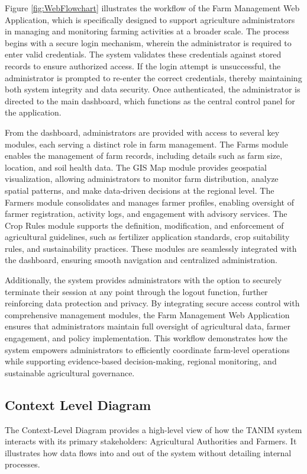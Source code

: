 {	Figure \ref{fig:WebFlowchart} illustrates the workflow of the Farm Management Web Application, which is specifically designed to support agriculture administrators in managing and monitoring farming activities at a broader scale. The process begins with a secure login mechanism, wherein the administrator is required to enter valid credentials. The system validates these credentials against stored records to ensure authorized access. If the login attempt is unsuccessful, the administrator is prompted to re-enter the correct credentials, thereby maintaining both system integrity and data security. Once authenticated, the administrator is directed to the main dashboard, which functions as the central control panel for the application.
	
	From the dashboard, administrators are provided with access to several key modules, each serving a distinct role in farm management. The Farms module enables the management of farm records, including details such as farm size, location, and soil health data. The GIS Map module provides geospatial visualization, allowing administrators to monitor farm distribution, analyze spatial patterns, and make data-driven decisions at the regional level. The Farmers module consolidates and manages farmer profiles, enabling oversight of farmer registration, activity logs, and engagement with advisory services. The Crop Rules module supports the definition, modification, and enforcement of agricultural guidelines, such as fertilizer application standards, crop suitability rules, and sustainability practices. These modules are seamlessly integrated with the dashboard, ensuring smooth navigation and centralized administration. 
	
	Additionally, the system provides administrators with the option to securely terminate their session at any point through the logout function, further reinforcing data protection and privacy. By integrating secure access control with comprehensive management modules, the Farm Management Web Application ensures that administrators maintain full oversight of agricultural data, farmer engagement, and policy implementation. This workflow demonstrates how the system empowers administrators to efficiently coordinate farm-level operations while supporting evidence-based decision-making, regional monitoring, and sustainable agricultural governance.
	
	\subsection{Context Level Diagram}
	The Context-Level Diagram provides a high-level view of how the TANIM system interacts with its primary stakeholders: Agricultural Authorities and Farmers. It illustrates how data flows into and out of the system without detailing internal processes.
	
}
